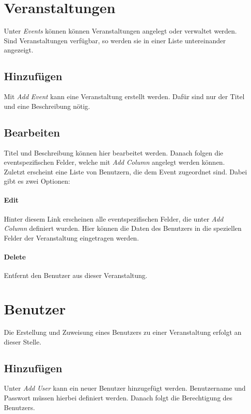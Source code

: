 \section{Veranstaltungen}
Unter \emph{Events} können können Veranstaltungen angelegt oder verwaltet werden. Sind Veranstaltungen verfügbar, so werden sie in einer Liste untereinander angezeigt.

\subsection{Hinzufügen}
Mit \emph{Add Event} kann eine Veranstaltung erstellt werden. Dafür sind nur der Titel und eine Beschreibung nötig.

\subsection{Bearbeiten}
Titel und Beschreibung können hier bearbeitet werden. Danach folgen die eventspezifischen Felder, welche mit \emph{Add Column} angelegt werden können.\\
Zuletzt erscheint eine Liste von Benutzern, die dem Event zugeordnet sind. Dabei gibt es zwei Optionen:

\paragraph{Edit}
Hinter diesem Link erscheinen alle eventspezifischen Felder, die unter \emph{Add Column} definiert wurden. Hier können die Daten des Benutzers in die speziellen Felder der Veranstaltung eingetragen werden.

\paragraph{Delete}
Entfernt den Benutzer aus dieser Veranstaltung.


\section{Benutzer}
Die Erstellung und Zuweisung eines Benutzers zu einer Veranstaltung erfolgt an dieser Stelle.

\subsection{Hinzufügen}
Unter \emph{Add User} kann ein neuer Benutzer hinzugefügt werden. Benutzername und Passwort müssen hierbei definiert werden. Danach folgt die Berechtigung des Benutzers.\par

